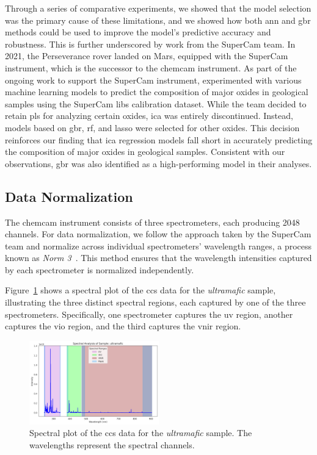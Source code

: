 Through a series of comparative experiments, we showed that the model selection was the primary cause of these limitations, and we showed how both \gls{ann} and \gls{gbr} methods could be used to improve the model's predictive accuracy and robustness.
This is further underscored by work from the SuperCam team.
In 2021, the Perseverance rover landed on Mars, equipped with the SuperCam instrument, which is the successor to the \gls{chemcam} instrument.
As part of the ongoing work to support the SuperCam instrument, \citet{andersonPostlandingMajorElement2022} experimented with various machine learning models to predict the composition of major oxides in geological samples using the SuperCam \gls{libs} calibration dataset.
While the team decided to retain \gls{pls} for analyzing certain oxides, \gls{ica} was entirely discontinued.
Instead, models based on \gls{gbr}, \gls{rf}, and \gls{lasso} were selected for other oxides.
This decision reinforces our finding that \gls{ica} regression models fall short in accurately predicting the composition of major oxides in geological samples.
Consistent with our observations, \gls{gbr} was also identified as a high-performing model in their analyses.

\subsection{Data Normalization}\label{sec:data_normalization}
The \gls{chemcam} instrument consists of three spectrometers, each producing 2048 channels.
For data normalization, we follow the approach taken by the SuperCam team and normalize across individual spectrometers' wavelength ranges, a process known as \textit{Norm 3}~\cite{andersonPostlandingMajorElement2022}.
This method ensures that the wavelength intensities captured by each spectrometer is normalized independently.

Figure~\ref{fig:spectral_plot} shows a spectral plot of the \gls{ccs} data for the \textit{ultramafic} sample, illustrating the three distinct spectral regions, each captured by one of the three spectrometers. Specifically, one spectrometer captures the \gls{uv} region, another captures the \gls{vio} region, and the third captures the \gls{vnir} region.

\begin{figure}[H]
	\centering
	\includegraphics[width=0.5\textwidth]{images/spectral_plot.png}
	\caption{Spectral plot of the \gls{ccs} data for the \textit{ultramafic} sample. The wavelengths represent the spectral channels.}
	\label{fig:spectral_plot}
\end{figure}

